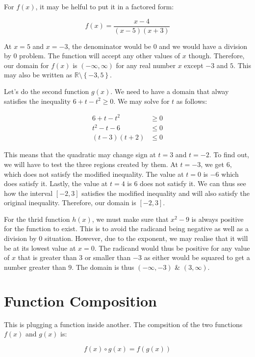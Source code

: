\documentclass[12pt]{article}
\begin{document}
For $f(x)$, it may be helful to put it in a factored form:

$$
    f(x) = \frac{x - 4}{(x-5)(x+3)}
$$

At $x=5$ and $x=-3$, the denominator would be $0$ and we would have a division by $0$ problem.
The function will accept any other values of $x$ though.
Therefore, our domain for $f(x)$ is $(-\infty, \infty)$ for any real number $x$ except $-3$ and $5$.
This may also be written as $\mathbb{R} \setminus \left\{ -3, 5 \right\}$.


Let's do the second function $g(x)$.
We need to have a domain that alway satisfies the inequality $6 + t - t^2 \geq 0$.
We may solve for $t$ as follows:

\begin{align}
    6 + t - t^2 & \geq 0 \\
    t^2 - t - 6 & \leq 0 \\
    (t-3)(t+2)  & \leq 0
\end{align}

This means that the quadratic may change sign at $t=3$ and $t=-2$.
To find out, we will have to test the three regions created by them.
At $t=-3$, we get $6$, which does not satisfy the modified inequality.
The value at $t=0$ is $-6$ which does satisfy it.
Lastly, the value at $t=4$ is $6$ does not satisfy it.
We can thus see how the interval $[-2, 3]$ satisfies the modified inequality and will also satisfy the original inequality.
Therefore, our domain is $[-2, 3]$.

For the thrid function $h(x)$, we must make sure that $x^2-9$ is always positive for the function to exist.
This is to avoid the radicand being negative as well as a division by $0$ situation.
However, due to the exponent, we may realise that it will be at its lowest value at $x=0$.
The radicand would thus be positive for any value of $x$ that is greater than $3$ or smaller than $-3$ as either would be squared to get a number greater than $9$.
The domain is thus $(-\infty, -3)$ \& $(3, \infty)$.

\section{Function Composition}

This is plugging a function inside another. The compsition of the two functions $f(x)$ and $g(x)$ is:


\begin{equation}
    f(x) \circ g(x) = f(g(x))
\end{equation}
\end{document}
